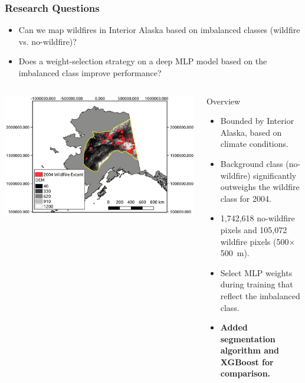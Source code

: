 \documentclass{beamer}
\begin{document}
\begin{frame}
  \frametitle{Research Questions}
  \begin{itemize}
  \footnotesize
   \item Can we map wildfires in Interior Alaska based on imbalanced classes (wildfire vs. no-wildfire)?
   \item Does a weight-selection strategy on a deep MLP model based on the imbalanced class improve performance? 
  \end{itemize}

\begin{columns}[T]
\begin{column}{.60\textwidth}
  \centering
             \includegraphics[width=\textwidth]{figs/study_area}
\end{column}%
\hfill%
\begin{column}{.40\textwidth}
Overview
\scriptsize
\begin{itemize}
 \item Bounded by Interior Alaska, based on climate conditions. 
 \item Background class (no-wildfire) significantly outweighs the wildfire class for 2004.
 \item 1,742,618 no-wildfire pixels and 105,072 wildfire pixels (500$\times$500~m).
 \item Select MLP weights during training that reflect the imbalanced class. 
 \item \textbf{Added segmentation algorithm and XGBoost for comparison.}
\end{itemize}
  
\end{column}%
\end{columns}
  
\end{frame}
\end{document}
